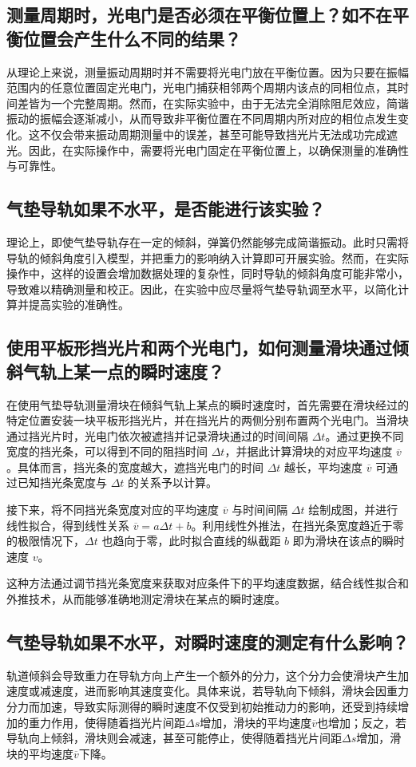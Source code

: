 \documentclass[UTF-8,twoside,cs4size]{ctexart}
\begin{document}
\subsection{测量周期时，光电门是否必须在平衡位置上？如不在平衡位置会产生什么不同的结果？}
{\kaishu 从理论上来说，测量振动周期时并不需要将光电门放在平衡位置。因为只要在振幅范围内的任意位置固定光电门，光电门捕获相邻两个周期内该点的同相位点，其时间差皆为一个完整周期。然而，在实际实验中，由于无法完全消除阻尼效应，简谐振动的振幅会逐渐减小，从而导致非平衡位置在不同周期内所对应的相位点发生变化。这不仅会带来振动周期测量中的误差，甚至可能导致挡光片无法成功完成遮光。因此，在实际操作中，需要将光电门固定在平衡位置上，以确保测量的准确性与可靠性。}

\subsection{气垫导轨如果不水平，是否能进行该实验？}
{\kaishu 理论上，即使气垫导轨存在一定的倾斜，弹簧仍然能够完成简谐振动。此时只需将导轨的倾斜角度引入模型，并把重力的影响纳入计算即可开展实验。然而，在实际操作中，这样的设置会增加数据处理的复杂性，同时导轨的倾斜角度可能非常小，导致难以精确测量和校正。因此，在实验中应尽量将气垫导轨调至水平，以简化计算并提高实验的准确性。}

\subsection{使用平板形挡光片和两个光电门，如何测量滑块通过倾斜气轨上某一点的瞬时速度？}
{\kaishu 在使用气垫导轨测量滑块在倾斜气轨上某点的瞬时速度时，首先需要在滑块经过的特定位置安装一块平板形挡光片，并在挡光片的两侧分别布置两个光电门。当滑块通过挡光片时，光电门依次被遮挡并记录滑块通过的时间间隔 $\Delta t$。通过更换不同宽度的挡光条，可以得到不同的阻挡时间 $\Delta t$，并据此计算滑块的对应平均速度 $\overline{v}$。具体而言，挡光条的宽度越大，遮挡光电门的时间 $\Delta t$ 越长，平均速度 $\overline{v}$ 可通过已知挡光条宽度与 $\Delta t$ 的关系予以计算。

接下来，将不同挡光条宽度对应的平均速度 $\overline{v}$ 与时间间隔 $\Delta t$ 绘制成图，并进行线性拟合，得到线性关系 $\overline{v} = a \Delta t + b$。利用线性外推法，在挡光条宽度趋近于零的极限情况下，$\Delta t$ 也趋向于零，此时拟合直线的纵截距 $b$ 即为滑块在该点的瞬时速度 $v$。

这种方法通过调节挡光条宽度来获取对应条件下的平均速度数据，结合线性拟合和外推技术，从而能够准确地测定滑块在某点的瞬时速度。}
\subsection{气垫导轨如果不水平，对瞬时速度的测定有什么影响？}
{\kaishu 轨道倾斜会导致重力在导轨方向上产生一个额外的分力，这个分力会使滑块产生加速度或减速度，进而影响其速度变化。具体来说，若导轨向下倾斜，滑块会因重力分力而加速，导致实际测得的瞬时速度不仅受到初始推动力的影响，还受到持续增加的重力作用，使得随着挡光片间距$\Delta s$增加，滑块的平均速度$\overline{v}$也增加；反之，若导轨向上倾斜，滑块则会减速，甚至可能停止，使得随着挡光片间距$\Delta s$增加，滑块的平均速度$\overline{v}$下降。}
\end{document}
